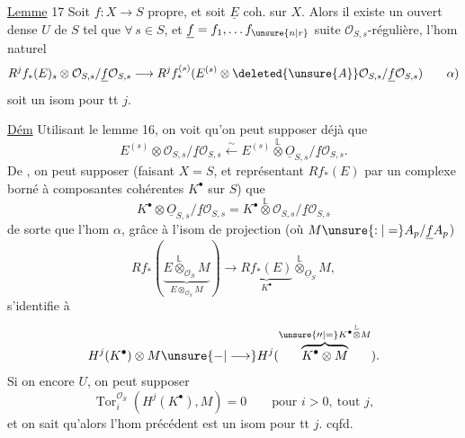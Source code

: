 \uline{Lemme} 17 Soit $f:X\longrightarrow S$ propre,  et soit $\underline E$ coh. sur $X$. Alors il existe un ouvert dense $U$ de $S$ tel que $\forall\,s\in S$, et $\underline f=f_1,\ldots f_{\unsure{n|r}}$ suite $\mathcal O_{S,s}$-régulière, l'hom naturel
\[
 R^jf_*(E)_s\otimes\mathcal O_{S,s}/\underline f\mathcal O_{S,s}
 \longrightarrow R^j f^{(s)}_*(E^{(s)}\otimes\deleted{\unsure{A}}\mathcal O_{S,s}/\underline f\mathcal O_{S,s})
 \tag*{$\alpha$)}
\]
soit un isom pour tt $j$.

\uline{Dém} Utilisant le lemme 16, on voit qu'on peut supposer déjà que
\[
 E^{(s)}\otimes\mathcal O_{S,s}/\underline f\mathcal O_{S,s}
 \overset{\sim}{\longleftarrow}E^{(s)}\overset{\mathbb L}{\otimes}\underline{O}_{S,s}/\underline f\mathcal O_{S,s}.
\]
De , on peut supposer  (faisant $X=S$,  et représentant $Rf_*(E)$ par un complexe borné à composantes cohérentes $K^\bullet$ sur $S$) que
\[
 K^\bullet\otimes \underline{O}_{S,s}/\underline f\mathcal O_{S,s}
 =K^\bullet\overset{\mathbb L}{\otimes}\mathcal O_{S,s}/\underline f\mathcal O_{S,s}
\]
de sorte que l'hom $\alpha$, grâce à l'isom de projection (où $M\unsure{:|=}A_p/\underline f A_p$)
\[
 Rf_*(\underbrace{E\overset{\mathbb L}{\otimes}_{\mathcal O_S}M}_{E\otimes_{\mathcal O_S}M})
 \longrightarrow\underbrace{Rf_*(E)}_{K^\bullet}\overset{\mathbb L}{\otimes}_{\underline{O}_S}M,
\]
s'identifie à
\[
 H^j(K^\bullet)\otimes M\unsure{-|\longrightarrow} H^j(\overbrace{K^\bullet\otimes M}^{\unsure{\prime\prime|=}K^\bullet\overset{\mathbb L}{\otimes}M}).
\]
Si on  encore $U$, on peut supposer
\[
 \operatorname{Tor}_i^{\mathcal O_S}(H^j(K^\bullet),M)=0\qquad\text{pour }i>0,\ \text{tout }j,
\]
et on sait qu'alors l'hom précédent est un isom pour tt $j$. \quad cqfd.
